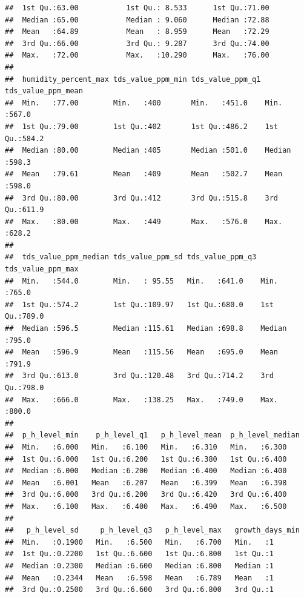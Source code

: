 \documentclass[
]{article}
\begin{document}
\begin{verbatim}
##  1st Qu.:63.00           1st Qu.: 8.533      1st Qu.:71.00      
##  Median :65.00           Median : 9.060      Median :72.88      
##  Mean   :64.89           Mean   : 8.959      Mean   :72.29      
##  3rd Qu.:66.00           3rd Qu.: 9.287      3rd Qu.:74.00      
##  Max.   :72.00           Max.   :10.290      Max.   :76.00      
##                                                                 
##  humidity_percent_max tds_value_ppm_min tds_value_ppm_q1 tds_value_ppm_mean
##  Min.   :77.00        Min.   :400       Min.   :451.0    Min.   :567.0     
##  1st Qu.:79.00        1st Qu.:402       1st Qu.:486.2    1st Qu.:584.2     
##  Median :80.00        Median :405       Median :501.0    Median :598.3     
##  Mean   :79.61        Mean   :409       Mean   :502.7    Mean   :598.0     
##  3rd Qu.:80.00        3rd Qu.:412       3rd Qu.:515.8    3rd Qu.:611.9     
##  Max.   :80.00        Max.   :449       Max.   :576.0    Max.   :628.2     
##                                                                            
##  tds_value_ppm_median tds_value_ppm_sd tds_value_ppm_q3 tds_value_ppm_max
##  Min.   :544.0        Min.   : 95.55   Min.   :641.0    Min.   :765.0    
##  1st Qu.:574.2        1st Qu.:109.97   1st Qu.:680.0    1st Qu.:789.0    
##  Median :596.5        Median :115.61   Median :698.8    Median :795.0    
##  Mean   :596.9        Mean   :115.56   Mean   :695.0    Mean   :791.9    
##  3rd Qu.:613.0        3rd Qu.:120.48   3rd Qu.:714.2    3rd Qu.:798.0    
##  Max.   :666.0        Max.   :138.25   Max.   :749.0    Max.   :800.0    
##                                                                          
##  p_h_level_min    p_h_level_q1   p_h_level_mean  p_h_level_median
##  Min.   :6.000   Min.   :6.100   Min.   :6.310   Min.   :6.300   
##  1st Qu.:6.000   1st Qu.:6.200   1st Qu.:6.380   1st Qu.:6.400   
##  Median :6.000   Median :6.200   Median :6.400   Median :6.400   
##  Mean   :6.001   Mean   :6.207   Mean   :6.399   Mean   :6.398   
##  3rd Qu.:6.000   3rd Qu.:6.200   3rd Qu.:6.420   3rd Qu.:6.400   
##  Max.   :6.100   Max.   :6.400   Max.   :6.490   Max.   :6.500   
##                                                                  
##   p_h_level_sd     p_h_level_q3   p_h_level_max   growth_days_min
##  Min.   :0.1900   Min.   :6.500   Min.   :6.700   Min.   :1      
##  1st Qu.:0.2200   1st Qu.:6.600   1st Qu.:6.800   1st Qu.:1      
##  Median :0.2300   Median :6.600   Median :6.800   Median :1      
##  Mean   :0.2344   Mean   :6.598   Mean   :6.789   Mean   :1      
##  3rd Qu.:0.2500   3rd Qu.:6.600   3rd Qu.:6.800   3rd Qu.:1      

\end{verbatim}
\end{document}

